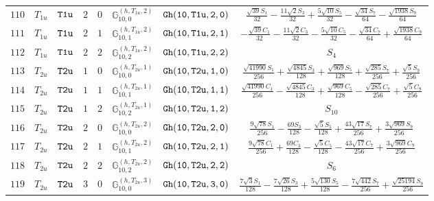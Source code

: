 \documentclass[fleqn,8pt]{jsarticle}
\begin{document}
\begin{table}[ht!]
\begin{center}
\begin{tabular}{cccccccc}
$ 110 $ & $ T_{1u} $ & $ {\tt T1u} $ & $ 2 $ & $ 0 $ & $ \mathbb{G}_{10,0}^{(h,T_{1u},2)} $ & $ {\tt Gh(10,T1u,2,0)} $ & $ \frac{\sqrt{39} S_{1}}{32} - \frac{11 \sqrt{2} S_{3}}{32} + \frac{5 \sqrt{10} S_{5}}{32} - \frac{\sqrt{34} S_{7}}{64} - \frac{\sqrt{1938} S_{9}}{64} $ \\
$ 111 $ & $ T_{1u} $ & $ {\tt T1u} $ & $ 2 $ & $ 1 $ & $ \mathbb{G}_{10,1}^{(h,T_{1u},2)} $ & $ {\tt Gh(10,T1u,2,1)} $ & $ - \frac{\sqrt{39} C_{1}}{32} - \frac{11 \sqrt{2} C_{3}}{32} - \frac{5 \sqrt{10} C_{5}}{32} - \frac{\sqrt{34} C_{7}}{64} + \frac{\sqrt{1938} C_{9}}{64} $ \\
$ 112 $ & $ T_{1u} $ & $ {\tt T1u} $ & $ 2 $ & $ 2 $ & $ \mathbb{G}_{10,2}^{(h,T_{1u},2)} $ & $ {\tt Gh(10,T1u,2,2)} $ & $ S_{4} $ \\
$ 113 $ & $ T_{2u} $ & $ {\tt T2u} $ & $ 1 $ & $ 0 $ & $ \mathbb{G}_{10,0}^{(h,T_{2u},1)} $ & $ {\tt Gh(10,T2u,1,0)} $ & $ \frac{\sqrt{41990} S_{1}}{256} + \frac{\sqrt{4845} S_{3}}{128} + \frac{\sqrt{969} S_{5}}{128} + \frac{\sqrt{285} S_{7}}{256} + \frac{\sqrt{5} S_{9}}{256} $ \\
$ 114 $ & $ T_{2u} $ & $ {\tt T2u} $ & $ 1 $ & $ 1 $ & $ \mathbb{G}_{10,1}^{(h,T_{2u},1)} $ & $ {\tt Gh(10,T2u,1,1)} $ & $ \frac{\sqrt{41990} C_{1}}{256} - \frac{\sqrt{4845} C_{3}}{128} + \frac{\sqrt{969} C_{5}}{128} - \frac{\sqrt{285} C_{7}}{256} + \frac{\sqrt{5} C_{9}}{256} $ \\
$ 115 $ & $ T_{2u} $ & $ {\tt T2u} $ & $ 1 $ & $ 2 $ & $ \mathbb{G}_{10,2}^{(h,T_{2u},1)} $ & $ {\tt Gh(10,T2u,1,2)} $ & $ S_{10} $ \\
$ 116 $ & $ T_{2u} $ & $ {\tt T2u} $ & $ 2 $ & $ 0 $ & $ \mathbb{G}_{10,0}^{(h,T_{2u},2)} $ & $ {\tt Gh(10,T2u,2,0)} $ & $ \frac{9 \sqrt{78} S_{1}}{256} - \frac{69 S_{3}}{128} - \frac{\sqrt{5} S_{5}}{128} + \frac{43 \sqrt{17} S_{7}}{256} + \frac{3 \sqrt{969} S_{9}}{256} $ \\
$ 117 $ & $ T_{2u} $ & $ {\tt T2u} $ & $ 2 $ & $ 1 $ & $ \mathbb{G}_{10,1}^{(h,T_{2u},2)} $ & $ {\tt Gh(10,T2u,2,1)} $ & $ \frac{9 \sqrt{78} C_{1}}{256} + \frac{69 C_{3}}{128} - \frac{\sqrt{5} C_{5}}{128} - \frac{43 \sqrt{17} C_{7}}{256} + \frac{3 \sqrt{969} C_{9}}{256} $ \\
$ 118 $ & $ T_{2u} $ & $ {\tt T2u} $ & $ 2 $ & $ 2 $ & $ \mathbb{G}_{10,2}^{(h,T_{2u},2)} $ & $ {\tt Gh(10,T2u,2,2)} $ & $ S_{6} $ \\
$ 119 $ & $ T_{2u} $ & $ {\tt T2u} $ & $ 3 $ & $ 0 $ & $ \mathbb{G}_{10,0}^{(h,T_{2u},3)} $ & $ {\tt Gh(10,T2u,3,0)} $ & $ \frac{7 \sqrt{3} S_{1}}{128} - \frac{7 \sqrt{26} S_{3}}{128} + \frac{5 \sqrt{130} S_{5}}{128} - \frac{7 \sqrt{442} S_{7}}{256} + \frac{\sqrt{25194} S_{9}}{256} $ \\

\end{tabular}
\end{center}
\end{table}
\end{document}
